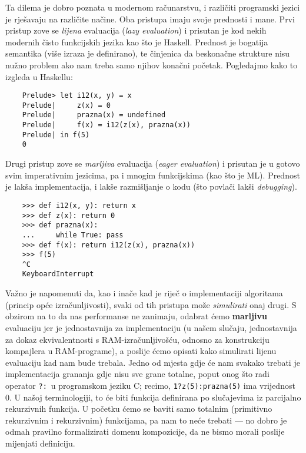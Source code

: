Ta dilema je dobro poznata u modernom računarstvu, i različiti programski jezici je rješavaju na različite načine. Oba pristupa imaju svoje prednosti i mane. Prvi pristup zove se \emph{lijena} evaluacija (\emph{lazy evaluation}) i prisutan je kod nekih modernih čisto funkcijskih jezika kao što je Haskell. Prednost je bogatija semantika (više izraza je definirano), te činjenica da beskonačne strukture nisu nužno problem ako nam treba samo njihov konačni početak. Pogledajmo kako to izgleda u Haskellu:
\begin{verbatim}
    Prelude> let i12(x, y) = x
    Prelude|     z(x) = 0
    Prelude|     prazna(x) = undefined
    Prelude|     f(x) = i12(z(x), prazna(x))
    Prelude| in f(5)
    0
\end{verbatim}
Drugi pristup zove se \emph{marljiva} evaluacija (\emph{eager evaluation}) i prisutan je u gotovo svim imperativnim jezicima, pa i mnogim funkcijskima (kao što je ML). Prednost je lakša implementacija, i lakše razmišljanje o kodu (što povlači lakši \emph{debugging}).
\begin{verbatim}
    >>> def i12(x, y): return x
    >>> def z(x): return 0
    >>> def prazna(x):
    ...     while True: pass
    >>> def f(x): return i12(z(x), prazna(x))
    >>> f(5)
    ^C
    KeyboardInterrupt
\end{verbatim}

Važno je napomenuti da, kao i inače kad je riječ o implementaciji algoritama (princip opće izračunljivosti), svaki od tih pristupa može \emph{simulirati} onaj drugi. S obzirom na to da nas performanse ne zanimaju, odabrat ćemo \textbf{marljivu} evaluaciju jer je jednostavnija za implementaciju (u našem slučaju, jednostavnija za dokaz ekvivalentnosti s RAM-izračunljivošću, odnosno za konstrukciju kompajlera u RAM-programe), a poslije ćemo opisati kako simulirati lijenu evaluaciju kad nam bude trebala. Jedno od mjesta gdje će nam svakako trebati je implementacija grananja gdje nisu sve grane totalne, poput onog što radi operator \texttt{?:}\ u programskom jeziku C; recimo, \texttt{1?z(5):prazna(5)} ima vrijednost $0$. U našoj terminologiji, to će biti funkcija definirana po slučajevima iz parcijalno rekurzivnih funkcija. U početku ćemo se baviti samo totalnim (primitivno rekurzivnim i rekurzivnim) funkcijama, pa nam to neće trebati --- no dobro je odmah pravilno formalizirati domenu kompozicije, da ne bismo morali poslije mijenjati definiciju.

